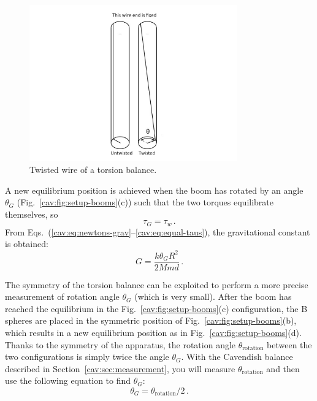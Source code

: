 \begin{figure}
	\centering
	\includegraphics[width=0.8\textwidth]{cavendish/torsion-balance}
	\caption{Twisted wire of a torsion balance.}\label{cav:fig:torsion}
\end{figure}

A new equilibrium position is achieved when the boom has rotated by an angle $\theta_G$ (Fig.~\ref{cav:fig:setup-booms}(c)) such that the two torques equilibrate themselves, so
\begin{equation}\label{cav:eq:equal-taus}
\tau_G = \tau_w \,.
\end{equation}
From Eqs.~(\ref{cav:eq:newtons-grav}--\ref{cav:eq:equal-taus}), the gravitational constant is obtained:
\begin{equation}\label{cav:eq:final-g}
G = \frac{k \theta_G R^2}{2 M m d}\,.
\end{equation}

The symmetry of the torsion balance can be exploited to perform a more precise
measurement of rotation angle $\theta_G$ (which is very small). After the boom has reached the
equilibrium in the Fig.~\ref{cav:fig:setup-booms}(c) configuration, the B spheres are placed in the symmetric position of Fig.~\ref{cav:fig:setup-booms}(b), which results in a new equilibrium position as in Fig.~\ref{cav:fig:setup-booms}(d).
Thanks to the symmetry of the apparatus, the rotation angle $\theta_\textrm{rotation}$ between the two
configurations is simply twice the angle $\theta_G$. With the Cavendish balance described in
Section~\ref{cav:sec:measurement}, you will measure $\theta_\textrm{rotation}$ and then use the following equation to find $\theta_G$:
\begin{equation}\label{cav:eq:theta-g}
 \theta_G = \theta_\textrm{rotation} / 2 \,.
\end{equation}

